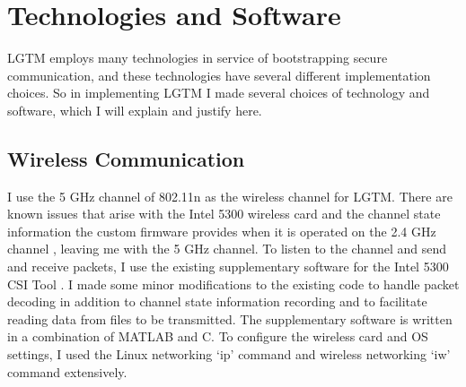 \documentclass[12pt]{report}
\begin{document}


\section{Technologies and Software}

LGTM employs many technologies in service of bootstrapping secure communication, and these technologies have several different implementation choices. So in implementing LGTM I made several choices of technology and software, which I will explain and justify here. \par

\subsection{Wireless Communication}
I use the 5 GHz channel of 802.11n as the wireless channel for LGTM. There are known issues that arise with the Intel 5300 wireless card and the channel state information the custom firmware provides when it is operated on the 2.4 GHz channel \cite{PhaserGjengset2014,SpotFiKotaru2015}, leaving me with the 5 GHz channel. To listen to the channel and send and receive packets, I use the existing supplementary software for the Intel 5300 CSI Tool \cite{ChannelStateInformationToolReleaseHalperin2011}. I made some minor modifications to the existing code to handle packet decoding in addition to channel state information recording and to facilitate reading data from files to be transmitted. The supplementary software is written in a combination of MATLAB and C. To configure the wireless card and OS settings, I used the Linux networking `ip' command and wireless networking `iw' command extensively. \par
\end{document}
